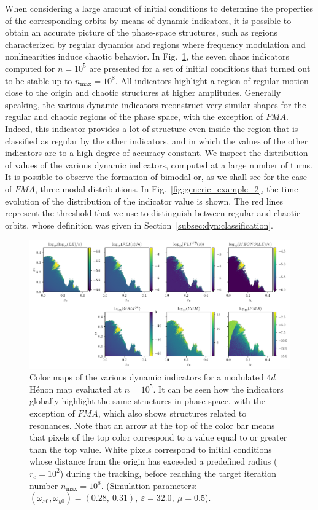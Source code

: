 \begin{chapterappendices}
When considering a large amount of initial conditions to determine the properties of the corresponding orbits by means of dynamic indicators, it is possible to obtain an accurate picture of the phase-space structures, such as regions characterized by regular dynamics and regions where frequency modulation and nonlinearities induce chaotic behavior. In Fig.~\ref{fig:generic_example}, the seven chaos indicators computed for $n=10^5$ are presented for a set of initial conditions that turned out to be stable up to $n_\text{max}=10^8$. All indicators highlight a region of regular motion close to the origin and chaotic structures at higher amplitudes. Generally speaking, the various dynamic indicators reconstruct very similar shapes for the regular and chaotic regions of the phase space, with the exception of $FMA$. Indeed, this indicator provides a lot of structure even inside the region that is classified as regular by the other indicators, and in which the values of the other indicators are to a high degree of accuracy constant. We inspect the distribution of values of the various dynamic indicators, computed at a large number of turns. It is possible to observe the formation of bimodal or, as we shall see for the case of $FMA$, three-modal distributions. In Fig.~\ref{fig:generic_example_2}, the time evolution of the distribution of the indicator value is shown. The red lines represent the threshold that we use to distinguish between regular and chaotic orbits, whose definition was given in Section~\ref{subsec:dyn:classification}.

\begin{figure}[ht]
    \centering
    \includegraphics[width=\textwidth]{6_dynamic_indicators/fig/corrected_figs/overview.pdf}
    \caption{Color maps of the various dynamic indicators for a modulated $4d$ Hénon map evaluated at $n=10^5$. It can be seen how the indicators globally highlight the same structures in phase space, with the exception of $FMA$, which also shows structures related to resonances. Note that an arrow at the top of the color bar means that pixels of the top color correspond to a value equal to or greater than the top value. White pixels correspond to initial conditions whose distance from the origin has exceeded a predefined radius ($r_c=10^2$) during the tracking, before reaching the target iteration number $n_\text{max}=10^8$. (Simulation parameters: $(\omega_{x0},\omega_{y0})= (0.28,\ 0.31),\ \varepsilon=32.0,\ \mu=0.5$).}
    \label{fig:generic_example}
\end{figure}


\end{chapterappendices}
